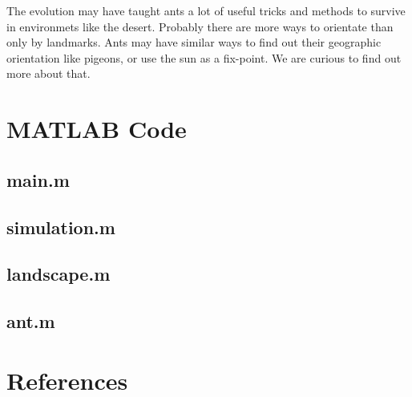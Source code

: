 \documentclass[11pt]{article}
\begin{document}
The evolution may have taught ants a lot of useful tricks and methods to survive in environmets like the desert. Probably there are more ways to orientate than only by landmarks. Ants may have similar ways to find out their geographic orientation like pigeons, or use the sun as a fix-point. We are curious to find out more about that.


\newpage
\section{MATLAB Code}
\subsection{main.m}

\subsection{simulation.m}

\subsection{landscape.m}

\subsection{ant.m}


\newpage
\section{References}




\listoffigures
\end{document}
